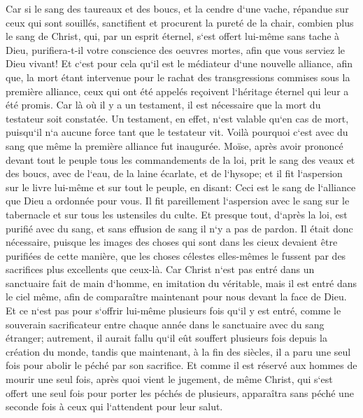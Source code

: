 \verse Car si le sang des taureaux et des boucs, et la cendre d`une vache, répandue sur ceux qui sont souillés, sanctifient et procurent la pureté de la chair, 
\verse combien plus le sang de Christ, qui, par un esprit éternel, s`est offert lui-même sans tache à Dieu, purifiera-t-il votre conscience des oeuvres mortes, afin que vous serviez le Dieu vivant! 
\verse Et c`est pour cela qu`il est le médiateur d`une nouvelle alliance, afin que, la mort étant intervenue pour le rachat des transgressions commises sous la première alliance, ceux qui ont été appelés reçoivent l`héritage éternel qui leur a été promis. 
\verse Car là où il y a un testament, il est nécessaire que la mort du testateur soit constatée. 
\verse Un testament, en effet, n`est valable qu`en cas de mort, puisqu`il n`a aucune force tant que le testateur vit. 
\verse Voilà pourquoi c`est avec du sang que même la première alliance fut inaugurée. 
\verse Moïse, après avoir prononcé devant tout le peuple tous les commandements de la loi, prit le sang des veaux et des boucs, avec de l`eau, de la laine écarlate, et de l`hysope; et il fit l`aspersion sur le livre lui-même et sur tout le peuple, en disant: 
\verse Ceci est le sang de l`alliance que Dieu a ordonnée pour vous. 
\verse Il fit pareillement l`aspersion avec le sang sur le tabernacle et sur tous les ustensiles du culte. 
\verse Et presque tout, d`après la loi, est purifié avec du sang, et sans effusion de sang il n`y a pas de pardon. 
\verse Il était donc nécessaire, puisque les images des choses qui sont dans les cieux devaient être purifiées de cette manière, que les choses célestes elles-mêmes le fussent par des sacrifices plus excellents que ceux-là. 
\verse Car Christ n`est pas entré dans un sanctuaire fait de main d`homme, en imitation du véritable, mais il est entré dans le ciel même, afin de comparaître maintenant pour nous devant la face de Dieu. 
\verse Et ce n`est pas pour s`offrir lui-même plusieurs fois qu`il y est entré, comme le souverain sacrificateur entre chaque année dans le sanctuaire avec du sang étranger; 
\verse autrement, il aurait fallu qu`il eût souffert plusieurs fois depuis la création du monde, tandis que maintenant, à la fin des siècles, il a paru une seul fois pour abolir le péché par son sacrifice. 
\verse Et comme il est réservé aux hommes de mourir une seul fois, après quoi vient le jugement, 
\verse de même Christ, qui s`est offert une seul fois pour porter les péchés de plusieurs, apparaîtra sans péché une seconde fois à ceux qui l`attendent pour leur salut. 

